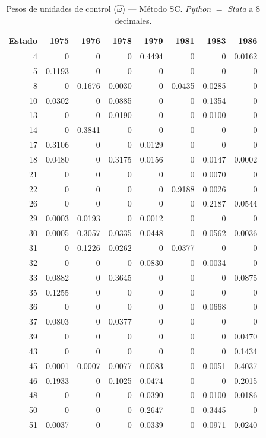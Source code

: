 \begin{table}[H]
\centering
\caption{Pesos de unidades de control ($\hat{\omega}$) --- M\'etodo SC. \textit{Python} $=$ \textit{Stata} a 8 decimales.}
\label{tab:omega_sc}
\small
\begin{tabular}{rrrrrrrr}
\toprule
Estado & 1975 & 1976 & 1978 & 1979 & 1981 & 1983 & 1986 \\
\midrule
4 & 0 & 0 & 0 & 0.4494 & 0 & 0 & 0.0162 \\
5 & 0.1193 & 0 & 0 & 0 & 0 & 0 & 0 \\
8 & 0 & 0.1676 & 0.0030 & 0 & 0.0435 & 0.0285 & 0 \\
10 & 0.0302 & 0 & 0.0885 & 0 & 0 & 0.1354 & 0 \\
13 & 0 & 0 & 0.0190 & 0 & 0 & 0.0100 & 0 \\
14 & 0 & 0.3841 & 0 & 0 & 0 & 0 & 0 \\
17 & 0.3106 & 0 & 0 & 0.0129 & 0 & 0 & 0 \\
18 & 0.0480 & 0 & 0.3175 & 0.0156 & 0 & 0.0147 & 0.0002 \\
21 & 0 & 0 & 0 & 0 & 0 & 0.0070 & 0 \\
22 & 0 & 0 & 0 & 0 & 0.9188 & 0.0026 & 0 \\
26 & 0 & 0 & 0 & 0 & 0 & 0.2187 & 0.0544 \\
29 & 0.0003 & 0.0193 & 0 & 0.0012 & 0 & 0 & 0 \\
30 & 0.0005 & 0.3057 & 0.0335 & 0.0448 & 0 & 0.0562 & 0.0036 \\
31 & 0 & 0.1226 & 0.0262 & 0 & 0.0377 & 0 & 0 \\
32 & 0 & 0 & 0 & 0.0830 & 0 & 0.0034 & 0 \\
33 & 0.0882 & 0 & 0.3645 & 0 & 0 & 0 & 0.0875 \\
35 & 0.1255 & 0 & 0 & 0 & 0 & 0 & 0 \\
36 & 0 & 0 & 0 & 0 & 0 & 0.0668 & 0 \\
37 & 0.0803 & 0 & 0.0377 & 0 & 0 & 0 & 0 \\
39 & 0 & 0 & 0 & 0 & 0 & 0 & 0.0470 \\
43 & 0 & 0 & 0 & 0 & 0 & 0 & 0.1434 \\
45 & 0.0001 & 0.0007 & 0.0077 & 0.0083 & 0 & 0.0051 & 0.4037 \\
46 & 0.1933 & 0 & 0.1025 & 0.0474 & 0 & 0 & 0.2015 \\
48 & 0 & 0 & 0 & 0.0390 & 0 & 0.0100 & 0.0186 \\
50 & 0 & 0 & 0 & 0.2647 & 0 & 0.3445 & 0 \\
51 & 0.0037 & 0 & 0 & 0.0339 & 0 & 0.0971 & 0.0240 \\
\bottomrule
\end{tabular}
\end{table}


